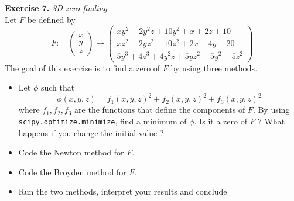 \documentclass{article}
\begin{document}
\vspace{0.5cm}
\noindent \textbf{Exercise 7.} \textit{3D zero finding} \\
Let $F$ be defined by
$$
F: \quad\left(\begin{array}{l}
x \\
y \\
z
\end{array}\right) \longmapsto\left(\begin{array}{l}
x y^2+2 y^2 z+10 y^2+x+2 z+10 \\
x z^2-2 y z^2-10 z^2+2 x-4 y-20 \\
5 y^3+4 z^3+4 y^2 z+5 y z^2-5 y^2-5 z^2
\end{array}\right)
$$
The goal of this exercise is to find a zero of $F$ by using three methods.
\begin{itemize}
    \item Let $\phi$ such that
$$
\phi(x, y, z)=f_1(x, y, z)^2+f_2(x, y, z)^2+f_3(x, y, z)^2
$$
where $f_1, f_2, f_3$ are the functions that define the components of $F$. By using \texttt{scipy.optimize.minimize}, find a minimum of $\phi$. Is it a zero of $F$ ? What happens if you change the initial value ?
\item Code the Newton method for $F$.
\item Code the Broyden method for $F$.
\item Run the two methods, interpret your results and conclude
\end{itemize}
\end{document}
